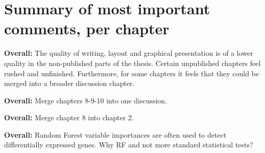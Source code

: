 \documentclass[10pt]{article}
\begin{document}
\section{Summary of most important comments, per chapter}

\textbf{Overall:} The quality of writing, layout and graphical presentation is of a lower quality in the non-published parts of the thesis. Certain unpublished chapters feel rushed and unfinished. Furthermore, for some chapters it feels that they could be merged into a broader discussion chapter.

\textbf{Overall:} Merge chapters 8-9-10 into one discussion.

\textbf{Overall:} Merge chapter 8 into chapter 2.

\textbf{Overall:} Random Forest variable importances are often used to detect differentially expressed genes. Why RF and not more standard statistical tests?
\end{document}
